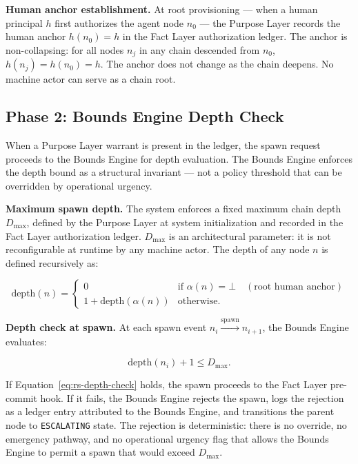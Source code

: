 \medskip
\noindent\textbf{Human anchor establishment.} At root provisioning — when a human principal $h$ first authorizes the agent node $n_0$ — the Purpose Layer records the human anchor $h(n_0) = h$ in the Fact Layer authorization ledger. The anchor is non-collapsing: for all nodes $n_j$ in any chain descended from $n_0$, $h(n_j) = h(n_0) = h$. The anchor does not change as the chain deepens. No machine actor can serve as a chain root.

\subsection{Phase 2: Bounds Engine Depth Check}
\label{sec:rs-phase2}

When a Purpose Layer warrant is present in the ledger, the spawn request proceeds to the Bounds Engine for depth evaluation. The Bounds Engine enforces the depth bound as a structural invariant — not a policy threshold that can be overridden by operational urgency.

\medskip
\noindent\textbf{Maximum spawn depth.} The system enforces a fixed maximum chain depth $D_{\max}$, defined by the Purpose Layer at system initialization and recorded in the Fact Layer authorization ledger. $D_{\max}$ is an architectural parameter: it is not reconfigurable at runtime by any machine actor. The depth of any node $n$ is defined recursively as:

\begin{equation}
\text{depth}(n) =
\begin{cases}
0 & \text{if } \alpha(n) = \bot \quad (\text{root human anchor}) \\[6pt]
1 + \text{depth}(\alpha(n)) & \text{otherwise}.
\end{cases}
\label{eq:rs-depth}
\end{equation}

\medskip
\noindent\textbf{Depth check at spawn.} At each spawn event $n_i \xrightarrow{\text{spawn}} n_{i+1}$, the Bounds Engine evaluates:

\begin{equation}
\text{depth}(n_i) + 1 \leq D_{\max}.
\label{eq:rs-depth-check}
\end{equation}

If Equation~\ref{eq:rs-depth-check} holds, the spawn proceeds to the Fact Layer pre-commit hook. If it fails, the Bounds Engine rejects the spawn, logs the rejection as a ledger entry attributed to the Bounds Engine, and transitions the parent node to \texttt{ESCALATING} state. The rejection is deterministic: there is no override, no emergency pathway, and no operational urgency flag that allows the Bounds Engine to permit a spawn that would exceed $D_{\max}$.

